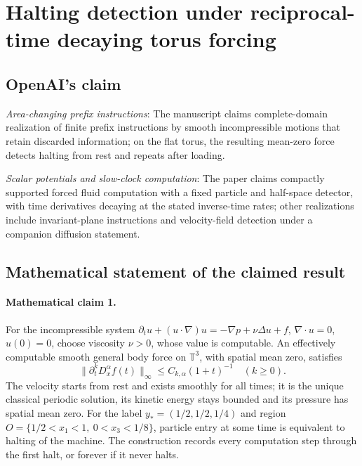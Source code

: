 \documentclass[11pt]{article}
\begin{document}
\section*{Halting detection under reciprocal-time decaying torus forcing}

\subsection{OpenAI's claim}
\textit{Area-changing prefix instructions}: The manuscript claims complete-domain realization of finite prefix instructions by smooth incompressible motions that retain discarded information; on the flat torus, the resulting mean-zero force detects halting from rest and repeats after loading.

\textit{Scalar potentials and slow-clock computation}: The paper claims compactly supported forced fluid computation with a fixed particle and half-space detector, with time derivatives decaying at the stated inverse-time rates; other realizations include invariant-plane instructions and velocity-field detection under a companion diffusion statement.

\subsection{Mathematical statement of the claimed result}
\paragraph{Mathematical claim 1.} For the incompressible system $\partial_tu+(u\cdot\nabla)u=-\nabla p+\nu\Delta u+f$, $\nabla\cdot u=0$, $u(0)=0$, choose viscosity $\nu>0$, whose value is computable. An effectively computable smooth general body force on $\mathbb T^3$, with spatial mean zero, satisfies \[\|\partial_t^kD_x^\alpha f(t)\|_\infty\le C_{k,\alpha}(1+t)^{-1}\quad(k\ge0).\] The velocity starts from rest and exists smoothly for all times; it is the unique classical periodic solution, its kinetic energy stays bounded and its pressure has spatial mean zero. For the label $y_*=(1/2,1/2,1/4)$ and region $O=\{1/2<x_1<1,\ 0<x_3<1/8\}$, particle entry at some time is equivalent to halting of the machine. The construction records every computation step through the first halt, or forever if it never halts.
\end{document}
